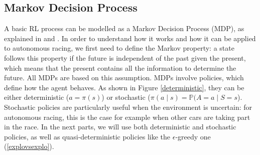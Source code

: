 \subsection{Markov Decision Process}
A basic RL process can be modelled as a Markov Decision Process (MDP), as explained in \cite{silver2015} and \cite{mdpinai}. In order to understand how it works and how it can be applied to autonomous racing, we first need to define the Markov property: a state follows this property if the future is independent of the past given the present, which means that the present contains all the information to determine the future. All MDPs are based on this assumption. MDPs involve policies, which define how the agent behaves. As shown in Figure \ref{deterministic}, they can be either deterministic ($a = \pi(s)$) or stochastic ($\pi(a \mid s) = \mathbb{P}(A=a \mid S=s$). Stochastic policies are particularly useful when the environment is uncertain: for autonomous racing, this is the case for example when other cars are taking part in the race. In the next parts, we will use both deterministic and stochastic policies, as well as quasi-deterministic policies like the $\epsilon$-greedy one (\ref{explovsexplo}).
